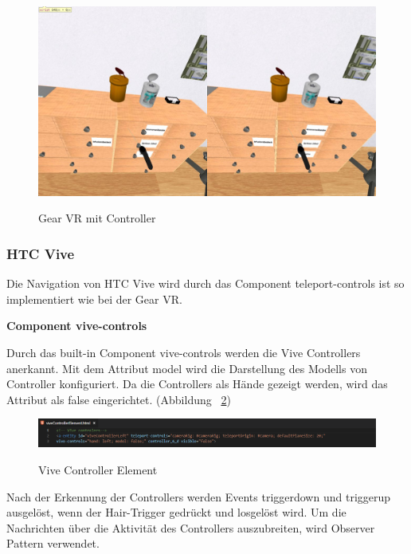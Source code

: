 \begin{figure}[ht]
\vspace*{1em}
\centering
\caption[Gear VR mit Controller]{Gear VR mit Controller}
\includegraphics[width=\textwidth]{images/gearVRWithController.png}
\label{fig:GearVRWithController} 
\end{figure}
  
  \subsubsection{HTC Vive}
  
  Die Navigation von HTC Vive wird durch das Component {\selectfont teleport-controls} ist so implementiert wie bei der Gear VR.
  
  \textbf{Component vive-controls}
  
  Durch das built-in Component {\selectfont vive-controls} werden die Vive Controllers anerkannt. Mit dem Attribut {\selectfont model} wird die Darstellung des Modells von Controller konfiguriert. Da die Controllers als Hände gezeigt werden, wird das Attribut als {\selectfont false} eingerichtet. (Abbildung ~\ref{fig:viveControllerElement})
  
\begin{figure}[ht]
\vspace*{1em}
\centering
\caption[Vive Controller Element]{Vive Controller Element}
\includegraphics[width=\textwidth]{images/viveControllerElement.png}
\label{fig:viveControllerElement} 
\end{figure}
  
  Nach der Erkennung der Controllers werden Events {\selectfont triggerdown} und {\selectfont triggerup} ausgelöst, wenn der Hair-Trigger gedrückt und losgelöst wird. Um die Nachrichten über die Aktivität des Controllers auszubreiten, wird Observer Pattern verwendet.
  
